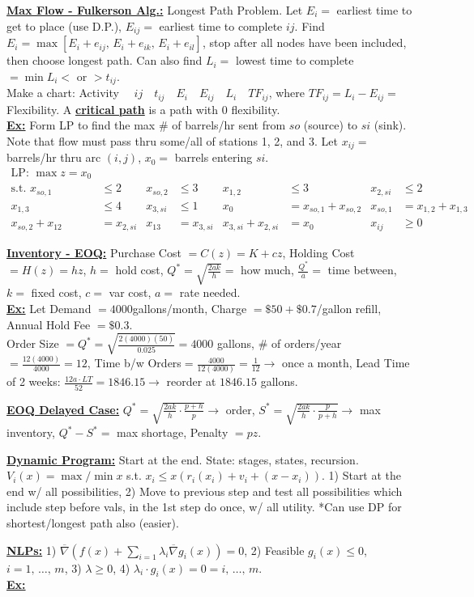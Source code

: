 \documentclass{article}
\newcommand{\define}[1]{\textbf{\underline{#1}}}
\theoremstyle{definition}
\theoremstyle{remark}
\begin{document}
{
    \noindent\define{Max Flow - Fulkerson Alg.:} Longest Path Problem. Let $E_i=$ earliest time to get to place (use D.P.), $E_{ij}=$ earliest time to complete $ij$. Find $E_i=\max[E_i+e_{ij}, \, E_i+e_{ik}, \, E_i+e_{il}]$, stop after all nodes have been included, then choose longest path. Can also find $L_i=$ lowest time to complete $=\min L_i <$ or $>t_{ij}$.\\
    Make a chart: Activity $\quad ij \quad t_{ij} \quad E_i \quad E_{ij} \quad L_i \quad TF_{ij}$, where $TF_{ij}=L_i-E_{ij}=$ Flexibility. A \define{critical path} is a path with 0 flexibility.\\\define{Ex:} Form LP to find the max \# of barrels/hr sent from $so$ (source) to $si$ (sink). Note that flow must pass thru some/all of stations 1, 2, and 3. Let $x_{ij}=$ barrels/hr thru arc $(i,j)$, $x_0=$ barrels entering $si$.
    \begin{align*}
        \text{LP: }\max z=x_0\\
        \text{s.t. }x_{so,1}&\leq 2 & x_{so,2}&\leq 3 & x_{1,2}&\leq 3 & x_{2,si}&\leq 2\\ x_{1,3}&\leq 4 & x_{3,si}&\leq 1 & x_0&=x_{so,1}+x_{so,2} & x_{so,1}&=x_{1,2}+x_{1,3}\\
        x_{so,2}+x_{12}&=x_{2,si} & x_{13}&=x_{3,si} & x_{3,si}+x_{2,si}&=x_0 & x_{ij} &\geq 0
    \end{align*}
    
    \noindent\define{Inventory - EOQ:} Purchase Cost $=C(z)=K+cz$, Holding Cost $=H(z)=hz$, $h=$ hold cost, $Q^*=\sqrt{\frac{2ak}{h}}=$ how much, $\frac{Q^*}{a}=$ time between, $k=$ fixed cost, $c=$ var cost, $a=$ rate needed.\\
    \define{Ex:} Let Demand $=4000$gallons/month, Charge $=\$50+\$0.7$/gallon refill, Annual Hold Fee $=\$0.3$.\\
    Order Size $=Q^*=\sqrt{\frac{2(4000)(50)}{0.025}}=4000$ gallons, \# of orders/year$=\frac{12(4000)}{4000}=12$, Time b/w Orders$=\frac{4000}{12(4000)}=\frac{1}{12} \xrightarrow{}$ once a month, Lead Time of 2 weeks: $\frac{12a\cdot LT}{52}=1846.15 \xrightarrow{}$ reorder at $1846.15$ gallons.
    
    \noindent\define{EOQ Delayed Case:} $Q^*=\sqrt{\frac{2ak}{h}\cdot \frac{p+h}{p}} \xrightarrow{}$ order, $S^*=\sqrt{\frac{2ak}{h}\cdot\frac{p}{p+h}}\xrightarrow{}$ max inventory, $Q^*-S^*=$ max shortage, Penalty $=pz$.
    
    \noindent\define{Dynamic Program:} Start at the end. State: stages, states, recursion. $V_i(x)=\max/\min x$ s.t. $x_i\leq x(r_i(x_i)+v_i+(x-x_i))$. 1) Start at the end w/ all possibilities, 2) Move to previous step and test all possibilities which include step before vals, in the 1st step do once, w/ all utility. *Can use DP for shortest/longest path also (easier).
    
    \noindent\define{NLPs:} 1) $\overline{\nabla}(f(x)+\sum_{i=1}\lambda_i\overline{\nabla}g_i(x))=0$, 2) Feasible $g_i(x) \leq 0$, $i=1, \,\ldots, \, m$, 3) $\lambda\geq 0$, 4) $\lambda_i\cdot g_i(x)=0=i, \, \ldots, \, m$.\\
    \define{Ex:}\\\\\\\\\\\\
    
    


}
\end{document}
